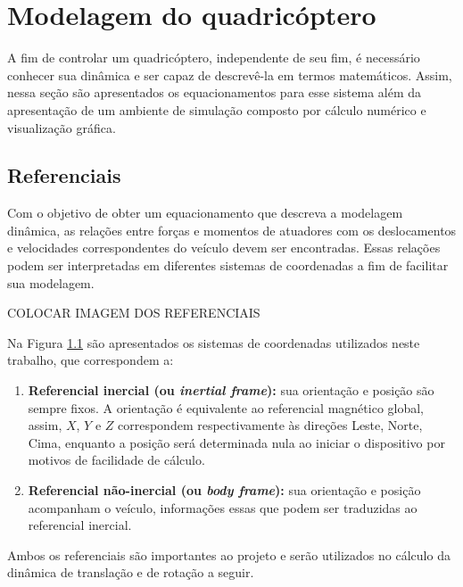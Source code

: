 \documentclass[main.tex]{subfiles}
\begin{document}
\chapter{Modelagem do quadricóptero}
\label{chap:modelagem}


A fim de controlar um quadricóptero, independente de seu fim, é necessário conhecer sua dinâmica e ser capaz de descrevê-la em termos matemáticos. Assim, nessa seção são apresentados os equacionamentos para esse sistema além da apresentação de um ambiente de simulação composto por cálculo numérico e visualização gráfica.

\section{Referenciais}


Com o objetivo de obter um equacionamento que descreva a modelagem dinâmica, as relações entre forças e momentos de atuadores com os deslocamentos e velocidades correspondentes do veículo devem ser encontradas. Essas relações podem ser interpretadas em diferentes sistemas de coordenadas a fim de facilitar sua modelagem. 

\textcolor{corrigir}{COLOCAR IMAGEM DOS REFERENCIAIS}

Na Figura \ref{} são apresentados os sistemas de coordenadas utilizados neste trabalho, que correspondem a:

\begin{enumerate}
    \item \textbf{Referencial inercial (ou \textit{inertial frame}):} sua orientação e posição são sempre fixos. A orientação é equivalente ao referencial magnético global, assim, $X$, $Y$ e $Z$ correspondem respectivamente às direções Leste, Norte, Cima, enquanto a posição será determinada nula ao iniciar o dispositivo por motivos de facilidade de cálculo. 
    \item \textbf{Referencial não-inercial (ou \textit{body frame}):} sua orientação e posição acompanham o veículo, informações essas que podem ser traduzidas ao referencial inercial.
\end{enumerate}

Ambos os referenciais são importantes ao projeto e serão utilizados no cálculo da dinâmica de translação e de rotação a seguir.
\end{document}
